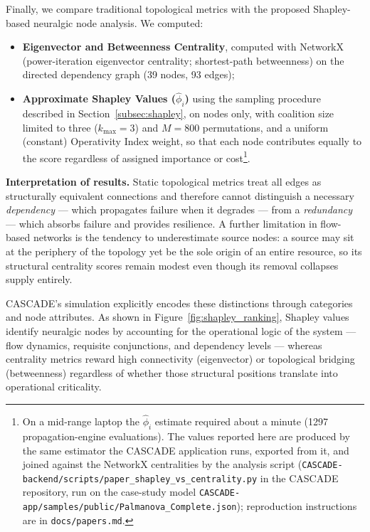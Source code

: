 \documentclass[review,12pt]{elsarticle}
\begin{document}
Finally, we compare traditional topological metrics with the proposed Shapley-based neuralgic node analysis.
We computed:
\begin{itemize}
  \item \textbf{Eigenvector and Betweenness Centrality}, computed with NetworkX (power-iteration eigenvector centrality; shortest-path betweenness) on the directed dependency graph (39 nodes, 93 edges);
  \item \textbf{Approximate Shapley Values ($\hat{\phi}_i$)} using the sampling procedure described in Section~\ref{subsec:shapley}, on nodes only, with coalition size limited to three ($k_{\max}=3$) and $M=800$ permutations, and a uniform (constant) Operativity Index weight, so that each node contributes equally to the score regardless of assigned importance or cost\footnote{On a mid-range laptop the $\hat{\phi}_i$ estimate required about a minute (1297 propagation-engine evaluations). The values reported here are produced by the same estimator the CASCADE application runs, exported from it, and joined against the NetworkX centralities by the analysis script (\texttt{CASCADE-backend/scripts/paper\_shapley\_vs\_centrality.py} in the CASCADE repository, run on the case-study model \texttt{CASCADE-app/samples/public/Palmanova\_Complete.json}); reproduction instructions are in \texttt{docs/papers.md}.}.
\end{itemize}

\noindent\textbf{Interpretation of results.}
Static topological metrics treat all edges as structurally equivalent connections and therefore cannot distinguish a necessary \emph{dependency} — which propagates failure when it degrades — from a \emph{redundancy} — which absorbs failure and provides resilience.
A further limitation in flow-based networks is the tendency to underestimate source nodes: a source may sit at the periphery of the topology yet be the sole origin of an entire resource, so its structural centrality scores remain modest even though its removal collapses supply entirely.

CASCADE's simulation explicitly encodes these distinctions through categories and node attributes.
As shown in Figure~\ref{fig:shapley_ranking}, Shapley values identify neuralgic nodes by accounting for the operational logic of the system --- flow dynamics, requisite conjunctions, and dependency levels --- whereas centrality metrics reward high connectivity (eigenvector) or topological
bridging (betweenness) regardless of whether those structural positions translate into operational criticality.
\end{document}
